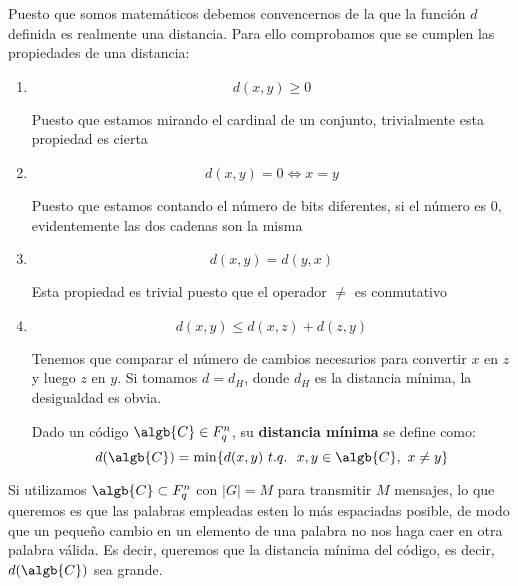\begin{prop}
Puesto que somos matemáticos debemos convencernos de la que la función $d$ definida es realmente una distancia. Para ello comprobamos que se cumplen las propiedades de una distancia:
\begin{enumerate}
\item
\[d(x,y) \geq 0\]

Puesto que estamos mirando el cardinal de un conjunto, trivialmente esta propiedad es cierta

\item
\[d(x,y)=0 \iff x=y\]

Puesto que estamos contando el número de bits diferentes, si el número es 0, evidentemente las dos cadenas son la misma

\item
\[d(x,y)=d(y,x)\]

Esta propiedad es trivial puesto que el operador $\neq$ es conmutativo

\item
\[d(x,y) \leq d(x,z)+d(z,y)\]

Tenemos que comparar el número de cambios necesarios para convertir $x$ en $z$ y luego $z$ en $y$. Si tomamos $d=d_H$, donde $d_H$ es la distancia mínima, la desigualdad es obvia.

\begin{defn}
Dado un código $\algb{C}\in F_q^n$, su \textbf{distancia mínima} se define como:
\[d(\algb{C}) = \min\{d(x,y) \ t.q. \ \ x,y \in \algb{C}, \ x \neq y\}\]
\end{defn}
\end{enumerate}
\end{prop}

Si utilizamos $\algb{C} \subset F_q^n$ con $|G|=M$ para transmitir $M$ mensajes, lo que queremos es que las palabras empleadas esten lo más espaciadas posible, de modo que un pequeño cambio en un elemento de una palabra no nos haga caer en otra palabra válida. Es decir, queremos que la distancia mínima del código, es decir, $d(\algb{C})$ sea grande.

